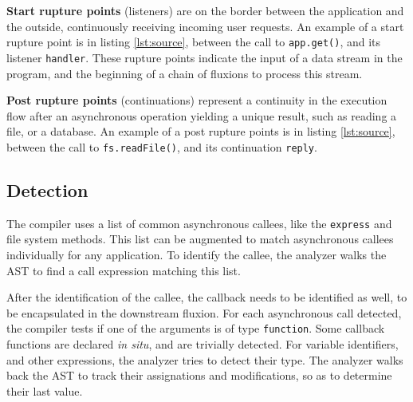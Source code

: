 \textbf{Start rupture points} (listeners) are on the border between the application and the outside, continuously receiving incoming user requests.
An example of a start rupture point is in listing \ref{lst:source}, between the call to \texttt{app.get()}, and its listener \texttt{handler}.
These rupture points indicate the input of a data stream in the program, and the beginning of a chain of fluxions to process this stream.

\textbf{Post rupture points} (continuations) represent a continuity in the execution flow after an asynchronous operation yielding a unique result, such as reading a file, or a database.
An example of a post rupture points is in listing \ref{lst:source}, between the call to \texttt{fs.readFile()}, and its continuation \texttt{reply}.

\subsection{Detection}

The compiler uses a list of common asynchronous callees, like the \texttt{express} and file system methods.
This list can be augmented to match asynchronous callees individually for any application.
To identify the callee, the analyzer walks the AST to find a call expression matching this list.

After the identification of the callee, the callback needs to be identified as well, to be encapsulated in the downstream fluxion.
For each asynchronous call detected, the compiler tests if one of the arguments is of type \texttt{function}.
Some callback functions are declared \textit{in situ}, and are trivially detected.
For variable identifiers, and other expressions, the analyzer tries to detect their type.
The analyzer walks back the AST to track their assignations and modifications, so as to determine their last value.





